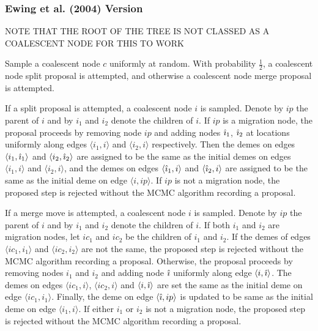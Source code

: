 \subsubsection{Ewing et al. (2004) Version}
	NOTE THAT THE ROOT OF THE TREE IS NOT CLASSED AS A COALESCENT NODE FOR THIS TO WORK
	
	Sample a coalescent  node $c$ uniformly at random. With probability $\frac{1}{2}$, a coalescent node split proposal is attempted, and otherwise a coalescent node merge proposal is attempted.
	
	If a split proposal is attempted, a coalescent node $i$ is sampled. Denote by $ip$ the parent of $i$ and by $i_1$ and $i_2$ denote the children of $i$. If $ip$ is a migration node, the proposal proceeds by removing node $ip$ and adding nodes $\hat{\imath}_1$, $\hat{\imath}_2$ at locations uniformly along edges $\langle i_1, i \rangle$ and $\langle i_2, i \rangle$ respectively. Then the demes on edges $\langle i_1, \hat{\imath}_1 \rangle$ and $\langle i_2, \hat{\imath}_2 \rangle$ are assigned to be the same as the initial demes on edges $\langle i_1, i \rangle$ and $\langle i_2, i \rangle$, and the demes on edges $\langle \hat{\imath}_1, i \rangle$ and $\langle \hat{\imath}_2, i \rangle$ are assigned to be the same as the initial deme on edge $\langle i, ip \rangle$. If $ip$ is not a migration node, the proposed step is rejected without the MCMC algorithm recording a proposal.
	
	If a merge move is attempted, a coalescent node $i$ is sampled. Denote by $ip$ the parent of $i$ and by $i_1$ and $i_2$ denote the children of $i$. If both $i_1$ and $i_2$ are migration nodes, let $ic_1$ and $ic_2$ be the children of $i_1$ and $i_2$. If the demes of edges $\langle ic_1, i_1 \rangle$ and $\langle ic_2, i_2 \rangle$ are not the same, the proposed step is rejected without the MCMC algorithm recording a proposal. Otherwise, the proposal proceeds by removing nodes $i_1$ and $i_2$ and adding node $\hat{\imath}$ uniformly along edge $\langle i, \hat{\imath} \rangle$. The demes on edges $\langle ic_1, i \rangle$, $\langle ic_2, i \rangle$ and $\langle i, \hat{\imath} \rangle$ are set the same as the initial deme on edge $\langle ic_1, i_1 \rangle$. Finally, the deme on edge $\langle \hat{\imath}, ip \rangle$ is updated to be same as the initial deme on edge $\langle i_1, i \rangle$. If either $i_1$ or $i_2$ is not a migration node, the proposed step is rejected without the MCMC algorithm recording a proposal.
	
